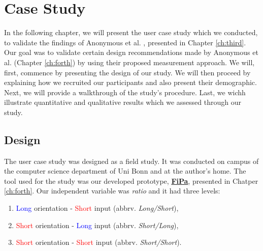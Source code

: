 
\chapter{Case Study}\label{ch:fifth}

In the following chapter, we will present the user case study which we conducted, to validate the findings of Anonymous et al. \cite{anonymous}, presented in Chapter \ref{ch:third}. Our goal was to validate certain design recommendations made by Anonymous et al. (Chapter \ref{ch:forth}) by using their proposed measurement approach. We will, first, commence by presenting the design of our study. We will then proceed by explaining how we recruited our participants and also present their demographic. Next, we will provide a walkthrough of the study's procedure. Last, we wichh illustrate quantitative and qualitative results which we assessed through our study. 



\section{Design} \label{5.1}

The user case study was designed as a field study. It was conducted on campus of the computer science department of Uni Bonn and at the author's home. The tool used for the study was our developed prototype, \underline{\textbf{FiPa}}, presented in Chatper \ref{ch:forth}. Our independent variable was \textit{ratio} and it had three levels:
\begin{enumerate}
    \item \textcolor{blue}{Long} orientation - \textcolor{red}{Short} input (abbrv. \textit{Long/Short}), 
    \item \textcolor{red}{Short} orientation - \textcolor{blue}{Long} input (abbrv. \textit{Short/Long}), 
    \item \textcolor{red}{Short} orientation - \textcolor{red}{Short} input (abbrv. \textit{Short/Short}). 
\end{enumerate}

